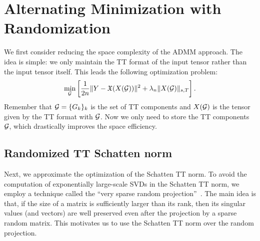 

\section{Alternating Minimization with Randomization}

We first consider reducing the space complexity of the ADMM
approach. The idea is simple: we only maintain the TT format of the
input tensor rather than the input tensor itself.  This leads the
following optimization problem:
\begin{align}
    \min_{\mathcal{G}} \left[ \frac{1}{2n} \|Y - \mathfrak{X}(X(\mathcal{G}))\|^2 + \lambda_n \| X(\mathcal{G})\|_{s,T} \right]. \label{opt:als0}
\end{align}
Remember that $\mathcal{G}=\{G_k\}_k$ is the set of TT components and $X(\mathcal{G})$
is the tensor given by the TT format with $\mathcal{G}$. Now we only need to
store the TT components $\mathcal{G}$, which drastically improves the space
efficiency.



\subsection{Randomized TT Schatten norm}

Next, we approximate the optimization of the Schatten TT norm. To avoid
the computation of exponentially large-scale SVDs in the Schatten TT norm,
we employ a technique called the ``very sparse random
projection''~\cite{li2006very}. The main idea is that, if the size of a
matrix is sufficiently larger than its rank, then its singular values
(and vectors) are well preserved even after the projection by a sparse
random matrix. This motivates us to use the Schatten TT norm over the
random projection.

